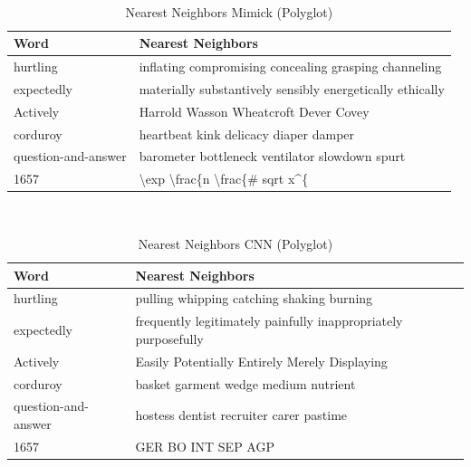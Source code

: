         \begin{table}[H]
          \begin{center}
            \caption{Nearest Neighbors Mimick (Polyglot)}
            ~\\
            \footnotesize
            \label{tab:nearest:lstm-polyglot}
            \begin{tabular}{l|l}
              \textbf{Word} & \textbf{Nearest Neighbors}\\
              \hline
              hurtling & inflating compromising concealing grasping channeling\\
              expectedly & materially substantively sensibly energetically ethically\\
              Actively & Harrold Wasson Wheatcroft Dever Covey\\
              corduroy & heartbeat kink delicacy diaper damper\\
              question-and-answer & barometer bottleneck ventilator slowdown spurt\\
              1657 & \textbackslash exp \textbackslash frac\{n \textbackslash frac\{\# sqrt x\^{}\{\\
            \end{tabular}
          \end{center}
        \end{table}

        \begin{table}[H]
          \begin{center}
            \caption{Nearest Neighbors CNN (Polyglot)}
            ~\\
            \footnotesize
            \label{tab:nearest:cnn-polyglot}
            \begin{tabular}{l|l}
              \textbf{Word} & \textbf{Nearest Neighbors}\\
              \hline
              hurtling & pulling whipping catching shaking burning\\
              expectedly & frequently legitimately painfully inappropriately purposefully\\
              Actively & Easily Potentially Entirely Merely Displaying\\
              corduroy & basket garment wedge medium nutrient\\
              question-and-answer & hostess dentist recruiter carer pastime\\
              1657 & GER BO INT SEP AGP\\
            \end{tabular}
          \end{center}
        \end{table}

